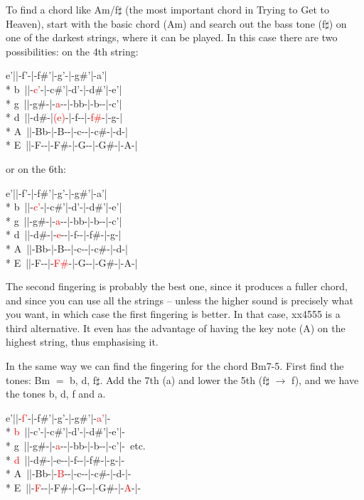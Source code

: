 To find a chord like Am/f$\sharp$ (the most important chord in Trying
to Get to Heaven), start with the basic chord (Am) and search out the
bass tone (f$\sharp$) on one of the darkest strings, where it can be
played. In this case there are two possibilities: on the 4th string:

\begin{pre}
\begin{adjustwidth}{2em}{0em}
e'||-f'-|-f\#'|-g'-|-g\#'|-a'|\\*
b~||-\textcolor{red}{c'}-|-c\#'|-d'-|-d\#'|-e'|\\*
g~||-g\#-|-\textcolor{red}{a}-{}-|-bb-|-b-{}-|-c'|\\*
d~||-d\#-|\textcolor{red}{(e)}-|-f-{}-|-\textcolor{red}{f\#}-|-g-|\\*
A~||-Bb-|-B-{}-|-c-{}-|-c\#-|-d-|\\*
E~||-F-{}-|-F\#-|-G-{}-|-G\#-|-A-|
\end{adjustwidth}
\end{pre}

or on the 6th: %
\begin{pre}
\begin{adjustwidth}{2em}{0em}
e'||-f'-|-f\#'|-g'-|-g\#'|-a'|\\*
b~||-\textcolor{red}{c'}-|-c\#'|-d'-|-d\#'|-e'|\\*
g~||-g\#-|-\textcolor{red}{a}-{}-|-bb-|-b-{}-|-c'|\\*
d~||-d\#-|-\textcolor{red}{e}-{}-|-f-{}-|-f\#-|-g-|\\*
A~||-Bb-|-B-{}-|-c-{}-|-c\#-|-d-|\\*
E~||-F-{}-|-\textcolor{red}{F\#}-|-G-{}-|-G\#-|-A-|
\end{adjustwidth}
\end{pre}

The second fingering is probably the best one, since it produces a
fuller chord, and since you can use all the strings -- unless the higher sound is precisely what you
want, in which case the first fingering is
better. In that case, xx4555 is a third alternative. It even has the
advantage of having the key note (A) on the highest string, thus
emphasising it.

In the same way we can find the fingering for the chord Bm7-5. First
find the tones: Bm $=$ b, d, f$\sharp$. Add the 7th (a) and lower the
5th (f$\sharp$ $\to$ f), and we have the tones b, d, f and a.

\begin{pre}
\begin{adjustwidth}{2em}{0em}
e'||-\textcolor{red}{f'}-|-f\#'|-g'-|-g\#'|-\textcolor{red}{a'}|-\\*
\textcolor{red}{b}~||-c'-|-c\#'|-d'-|-d\#'|-e'|-\\*
g~||-g\#-|-\textcolor{red}{a}-{}-|-bb-|-b-{}-|-c'|-~etc.\\*
\textcolor{red}{d}~||-d\#-|-e-{}-|-f-{}-|-f\#-|-g-|-\\*
A~||-Bb-|-\textcolor{red}{B}-{}-|-c-{}-|-c\#-|-d-|-\\*
E~||-\textcolor{red}{F}-{}-|-F\#-|-G-{}-|-G\#-|-\textcolor{red}{A}-|-
\end{adjustwidth}
\end{pre}

